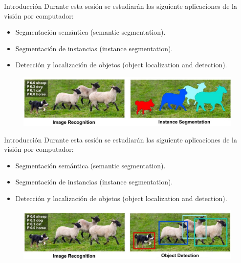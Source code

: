 \begin{frame}{Introducción}
Durante esta sesión se estudiarán las siguiente aplicaciones de la visión por computador:
\begin{itemize}
    \item Segmentación semántica (semantic segmentation).
    \item \alert{Segmentación de instancias} (instance segmentation).
    \item Detección y localización de objetos (object localization and detection).
\end{itemize}

\begin{figure}
    \centering
    \includegraphics[width=\textwidth]{figures/Tema 4/InstanceSeg.jpg}
    \caption{\cite{InstanceSeg}}
\end{figure}
\end{frame}

\begin{frame}{Introducción}
Durante esta sesión se estudiarán las siguiente aplicaciones de la visión por computador:
\begin{itemize}
    \item Segmentación semántica (semantic segmentation).
    \item Segmentación de instancias (instance segmentation).
    \item \alert{Detección y localización de objetos} (object localization and detection).
\end{itemize}

\begin{figure}
    \centering
    \includegraphics[width=\textwidth]{figures/Tema 4/ObjectDet.jpg}
    \caption{\cite{ObjectDet}}
\end{figure}
\end{frame}

